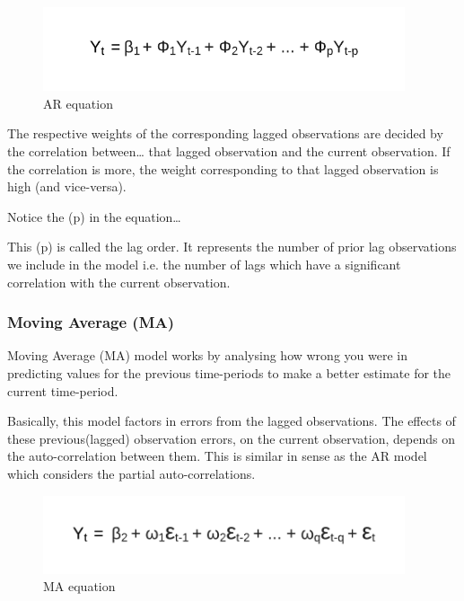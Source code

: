 \documentclass[12pt]{report}
\begin{document}
\begin{figure}[H]%
  \begin {center}
  \includegraphics[width=0.95\textwidth]{images/AR_E.png}
  \caption{AR equation}
  \label{fig:ecg}
  \end {center}
\end{figure}

The respective weights of the corresponding lagged observations are decided by the correlation between… that lagged observation and the current observation. If the correlation is more, the weight corresponding to that lagged observation is high (and vice-versa).

Notice the (p) in the equation…

This (p) is called the lag order. It represents the number of prior lag observations we include in the model i.e. the number of lags which have a significant correlation with the current observation.

\subsubsection{Moving Average (MA)}
Moving Average (MA) model works by analysing how wrong you were in predicting values for the previous time-periods to make a better estimate for the current time-period.

Basically, this model factors in errors from the lagged observations. The effects of these previous(lagged) observation errors, on the current observation, depends on the auto-correlation between them. This is similar in sense as the AR model which considers the partial auto-correlations.

\begin{figure}[H]%
  \begin {center}
  \includegraphics[width=0.95\textwidth]{images/MA_.png}
  \caption{MA equation}
  \label{fig:ecg}
  \end {center}
\end{figure}
\end{document}
